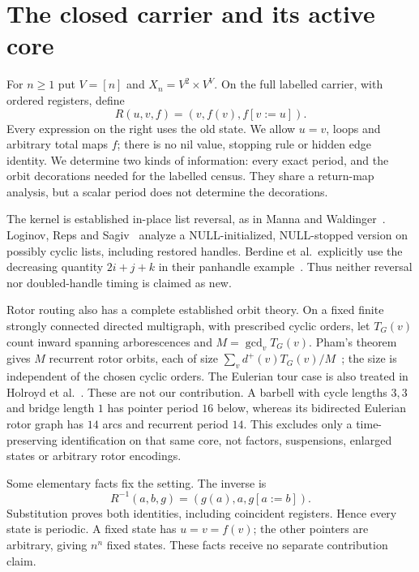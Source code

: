 \section{The closed carrier and its active core}
For $n\ge1$ put $V=[n]$ and $X_n=V^2\times V^V$. On the full labelled
carrier, with ordered registers, define
\begin{equation}\label{eq:update}
 R(u,v,f)=(v,f(v),f[v:=u]).
\end{equation}
Every expression on the right uses the old state. We allow $u=v$, loops and
arbitrary total maps $f$; there is no nil value, stopping rule or hidden edge
identity. We determine two kinds of information: every exact period, and
the orbit decorations needed for the labelled census. They share a return-map
analysis, but a scalar period does not determine the decorations.

The kernel is established in-place list reversal, as in Manna and
Waldinger~\cite{manna1987}. Loginov, Reps and Sagiv~\cite{loginov2007}
analyze a NULL-initialized, NULL-stopped version on possibly cyclic lists,
including restored handles. Berdine et al.\ explicitly use the decreasing
quantity $2i+j+k$ in their panhandle example~\cite[Example~8]{berdine2006}.
Thus neither reversal nor doubled-handle timing is claimed as new.

Rotor routing also has a complete established orbit theory. On a fixed finite
strongly connected directed multigraph, with prescribed cyclic orders, let
$T_G(v)$ count inward spanning arborescences and $M=\gcd_v T_G(v)$.
Pham's theorem gives $M$ recurrent rotor orbits, each of size
$\sum_v d^+(v)T_G(v)/M$~\cite[Theorem~1]{pham2015}; the size is independent
of the chosen cyclic orders. The Eulerian tour case is also treated in
Holroyd et al.\ \cite[Theorem~3.8]{holroyd2008}.
These are not our contribution. A barbell with cycle lengths $3,3$ and bridge
length $1$ has pointer period $16$ below, whereas its bidirected Eulerian
rotor graph has $14$ arcs and recurrent period $14$. This excludes only a
time-preserving identification on that same core, not factors, suspensions,
enlarged states or arbitrary rotor encodings.

Some elementary facts fix the setting. The inverse is
\begin{equation}\label{eq:inverse}
 R^{-1}(a,b,g)=(g(a),a,g[a:=b]).
\end{equation}
Substitution proves both identities, including coincident registers. Hence
every state is periodic. A fixed state has $u=v=f(v)$; the other pointers
are arbitrary, giving $n^n$ fixed states. These facts receive no separate
contribution claim.

